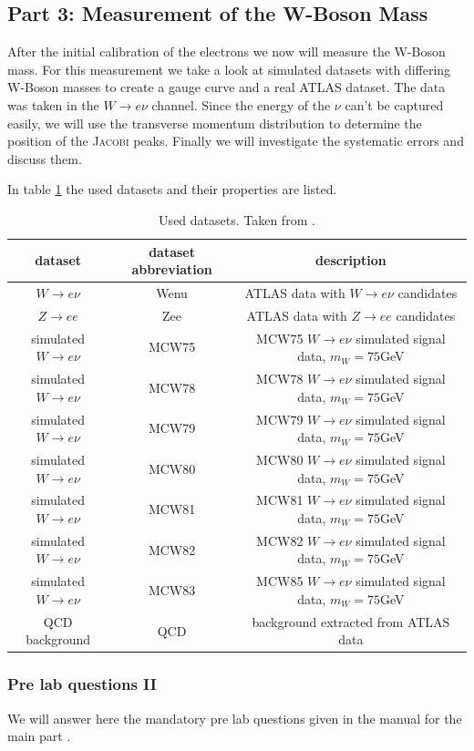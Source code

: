 \documentclass[11pt,a4paper,notitlepage]{scrartcl}
\begin{document}
\subsection{Part 3: Measurement of the W-Boson Mass}
After the initial calibration of the electrons we now will measure the W-Boson mass. For this measurement we take a look at simulated datasets with differing W-Boson masses  to create a gauge curve and a real ATLAS dataset. The data was taken in the $W\to e\nu$ channel. Since the energy of the $\nu$ can't be captured easily, we will use the  transverse momentum distribution to determine the position of the \textsc{Jacobi} peaks. Finally we will investigate the systematic errors and discuss them.

\noindent In table \ref{tab:datasets} the used datasets and their properties are listed.
\begin{table}[htbp]
	\centering
	\begin{tabular}{|c|c|c|}
		\hline
		dataset& dataset abbreviation & description  \\
		\hline
		$W\to e\nu$ & Wenu & ATLAS data with $W\to e\nu$  candidates \\
		$Z\to ee$ & Zee & ATLAS data with $Z\to ee$  candidates \\
		simulated $W\to e\nu$ & MCW75 & MCW75 $W\to e\nu$  simulated signal data, $m_W=75$GeV \\
		simulated $W\to e\nu$ & MCW78 & MCW78 $W\to e\nu$  simulated signal data, $m_W=75$GeV \\
		simulated $W\to e\nu$ & MCW79 & MCW79 $W\to e\nu$  simulated signal data, $m_W=75$GeV \\
		simulated $W\to e\nu$ & MCW80 & MCW80 $W\to e\nu$  simulated signal data, $m_W=75$GeV \\
		simulated $W\to e\nu$ & MCW81 & MCW81 $W\to e\nu$  simulated signal data, $m_W=75$GeV \\
		simulated $W\to e\nu$ & MCW82 & MCW82 $W\to e\nu$  simulated signal data, $m_W=75$GeV \\
		simulated $W\to e\nu$ & MCW83 & MCW85 $W\to e\nu$  simulated signal data, $m_W=75$GeV \\
		QCD background & QCD & background extracted from ATLAS data\\
		\hline
	\end{tabular} 
	\caption{Used datasets. Taken from \cite{manual}.}\label{tab:datasets}
\end{table}

\subsubsection{Pre lab questions II}
We will answer here the mandatory pre lab questions given in the manual for the main part \cite{manual}.
\end{document}
